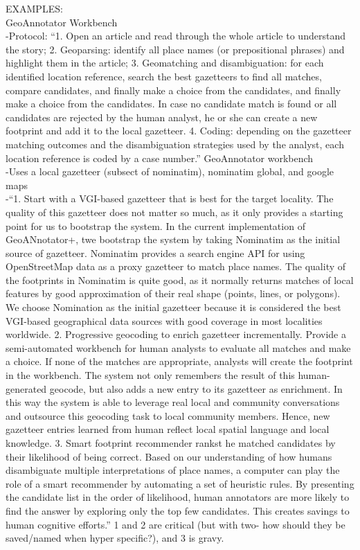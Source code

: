 EXAMPLES:\\
GeoAnnotator Workbench\\
-{\color{orange}Protocol: “1. Open an article and read through the whole article to understand the story; 2. Geoparsing: identify all place names (or prepositional phrases) and highlight them in the article; 3. Geomatching and disambiguation: for each identified location reference, search the best gazetteers to find all matches, compare candidates, and finally make a choice from the candidates, and finally make a choice from the candidates. In case no candidate match is found or all candidates are rejected by the human analyst, he or she can create a new footprint and add it to the local gazetteer. 4. Coding: depending on the gazetteer matching outcomes and the disambiguation strategies used by the analyst, each location reference is coded by a case number.” GeoAnnotator workbench\cite{Cai2016}}\\
-{\color{orange}Uses a local gazetteer (subsect of nominatim), nominatim global, and google maps\cite{Cai2016}}\\
-{\color{orange}“1. Start with a VGI-based gazetteer that is best for the target locality. The quality of this gazetteer does not matter so much, as it only provides a starting point for us to bootstrap the system. In the current implementation of GeoANnotator+, twe bootstrap the system by taking Nominatim as the initial source of gazetteer. Nominatim provides a search engine API for using OpenStreetMap data as a proxy gazetteer to match place names. The quality of the footprints in Nominatim is quite good, as it normally returns matches of local features by good approximation of their real shape (points, lines, or polygons). We choose Nomination as the initial gazetteer because it is considered the best VGI-based geographical data sources with good coverage in most localities worldwide. 2. Progressive geocoding to enrich gazetteer incrementally. Provide a semi-automated workbench for human analysts to evaluate all matches and make a choice. If none of the matches are appropriate, analysts will create the footprint in the workbench. The system not only remembers the result of this human-generated geocode, but also adds a new entry to its gazetteer as enrichment. In this way the system is able to leverage real local and community conversations and outsource this geocoding task to local community members. Hence, new gazetteer entries learned from human reflect local spatial language and local knowledge. 3. Smart footprint recommender rankst he matched candidates by their likelihood of being correct. Based on our understanding of how humans disambiguate multiple interpretations of place names, a computer can play the role of a smart recommender by automating a set of heuristic rules. By presenting the candidate list in the order of likelihood, human annotators are more likely to find the answer by exploring only the top few candidates. This creates savings to human cognitive efforts.” 1 and 2 are critical (but with two- how should they be saved/named when hyper specific?), and 3 is gravy.\cite{Cai2016}}\\
